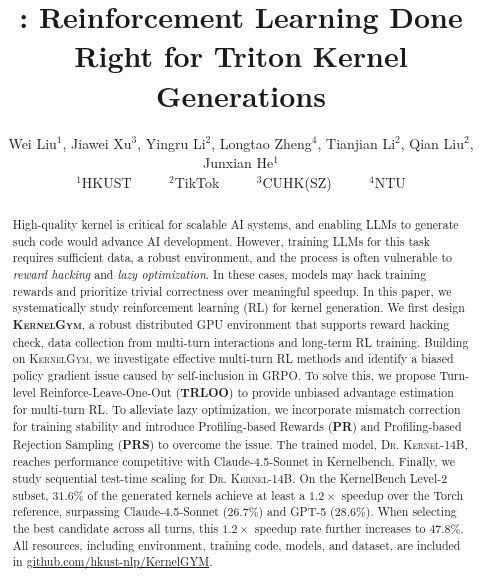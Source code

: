 \documentclass{article} %
\title{\kernel: Reinforcement Learning Done Right for Triton Kernel Generations}
\author{  
  Wei Liu$^1$,
  Jiawei Xu$^3$,
  Yingru Li$^2$,
  Longtao Zheng$^4$,
  Tianjian Li$^2$,
  Qian Liu$^2$,
  Junxian He$^1$\\
  $^1$HKUST $\qquad$ $^2$TikTok $\qquad$ $^3$CUHK(SZ) $\qquad$ $^4$NTU
}
\newcommand{\env}{\textsc{KernelGym}}
\newcommand{\kernel}{\textsc{Dr. Kernel}}
\begin{document}
\ifcolmsubmission
\linenumbers
\fi

\maketitle

\begin{abstract}
High-quality kernel is critical for scalable AI systems, and enabling LLMs to generate such code would advance AI development. However, training LLMs for this task requires sufficient data, a robust environment, and the process is often vulnerable to \emph{reward hacking} and \emph{lazy optimization}. In these cases, models may hack training rewards and prioritize trivial correctness over meaningful speedup. In this paper, we systematically study reinforcement learning (RL) for kernel generation. We first design \textbf{\env{}}, a robust distributed GPU environment that supports reward hacking check, data collection from multi-turn interactions and long-term RL training. Building on \env{}, we investigate effective multi-turn RL methods and identify a biased policy gradient issue caused by self-inclusion in GRPO. To solve this, we propose Turn-level Reinforce-Leave-One-Out (\textbf{TRLOO}) to provide unbiased advantage estimation for multi-turn RL. To alleviate lazy optimization, we incorporate mismatch correction for training stability and introduce Profiling-based Rewards (\textbf{PR}) and Profiling-based Rejection Sampling (\textbf{PRS}) to overcome the issue. The trained model, \kernel-14B, reaches performance competitive with Claude-4.5-Sonnet in Kernelbench. Finally, we study sequential test-time scaling for \kernel-14B. On the KernelBench Level-2 subset, $31.6\%$ of the generated kernels achieve at least a $1.2\times$ speedup over the Torch reference, surpassing Claude-4.5-Sonnet ($26.7\%$) and GPT-5 ($28.6\%$). When selecting the best candidate across all turns, this $1.2\times$ speedup rate further increases to $47.8\%$. All resources, including environment, training code, models, and dataset, are included in \href{https://www.github.com/hkust-nlp/KernelGYM}{github.com/hkust-nlp/KernelGYM}.

\end{abstract}
\end{document}
